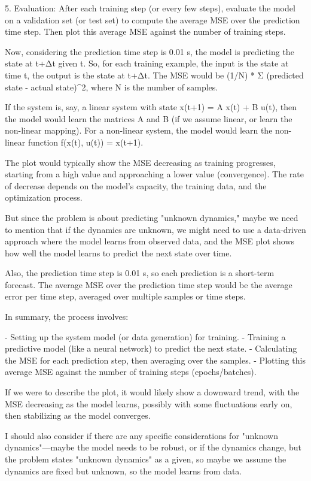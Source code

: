 5. Evaluation: After each training step (or every few steps), evaluate the model on a validation set (or test set) to compute the average MSE over the prediction time step. Then plot this average MSE against the number of training steps.

Now, considering the prediction time step is 0.01 s, the model is predicting the state at t+Δt given t. So, for each training example, the input is the state at time t, the output is the state at t+Δt. The MSE would be (1/N) * Σ (predicted state - actual state)^2, where N is the number of samples.

If the system is, say, a linear system with state x(t+1) = A x(t) + B u(t), then the model would learn the matrices A and B (if we assume linear, or learn the non-linear mapping). For a non-linear system, the model would learn the non-linear function f(x(t), u(t)) = x(t+1).

The plot would typically show the MSE decreasing as training progresses, starting from a high value and approaching a lower value (convergence). The rate of decrease depends on the model's capacity, the training data, and the optimization process.

But since the problem is about predicting "unknown dynamics," maybe we need to mention that if the dynamics are unknown, we might need to use a data-driven approach where the model learns from observed data, and the MSE plot shows how well the model learns to predict the next state over time.

Also, the prediction time step is 0.01 s, so each prediction is a short-term forecast. The average MSE over the prediction time step would be the average error per time step, averaged over multiple samples or time steps.

In summary, the process involves:

- Setting up the system model (or data generation) for training.
- Training a predictive model (like a neural network) to predict the next state.
- Calculating the MSE for each prediction step, then averaging over the samples.
- Plotting this average MSE against the number of training steps (epochs/batches).

If we were to describe the plot, it would likely show a downward trend, with the MSE decreasing as the model learns, possibly with some fluctuations early on, then stabilizing as the model converges.

I should also consider if there are any specific considerations for "unknown dynamics"—maybe the model needs to be robust, or if the dynamics change, but the problem states "unknown dynamics" as a given, so maybe we assume the dynamics are fixed but unknown, so the model learns from data.

